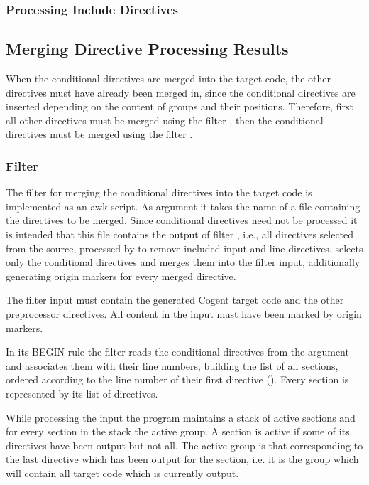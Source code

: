 \subsubsection{Processing Include Directives}

\subsection{Merging Directive Processing Results}

When the conditional directives are merged into the target code, the other 
directives must have already been merged in, since the conditional directives are inserted depending on the content 
of groups and their positions. Therefore, first all other directives must be merged using the filter ,
then the conditional directives must be merged using the filter .

\subsubsection{Filter }

The filter for merging the conditional directives into the target code is implemented as an awk script. As argument
it takes the name of a file containing the directives to be merged. Since conditional directives need not be
processed it is intended that this file contains the output of filter , i.e., all directives
selected from the source, processed by  to remove included input and line directives. 
 selects only the conditional directives and merges them into
the filter input, additionally generating origin markers for every merged directive. 

The filter input must contain the generated Cogent target code and the other preprocessor directives. 
All content in the input must have been marked by origin markers. 

In its BEGIN rule the filter reads the
conditional directives from the argument  and associates them with their line numbers, building the
list of all sections, ordered according to the line number of their first directive ().
Every section is represented by its list of directives.

While processing the input the program maintains a stack of active sections and for every section in the stack the 
active group. A section is active if some of its directives have been output but not all. The active group is that
corresponding to the last directive which has been output for the section, i.e. it is the group which will contain
all target code which is currently output.

